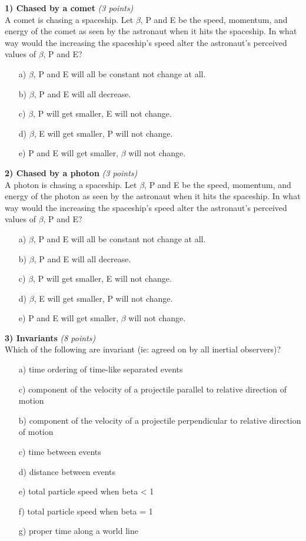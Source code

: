 {\large


\textbf{1) Chased by a comet }\hfill \textit{(3 points)}\\
A comet is chasing a spaceship.
Let $\beta$, P and E be the speed, momentum, and energy of the comet as seen by the astronaut when it hits the spaceship. 
In what way would the increasing the spaceship's speed alter the astronaut's perceived values of $\beta$, P and E?
\begin{itemize}
\item[a)] $\beta$, P and E will all be constant not change at all.
\item[b)] $\beta$, P and E will all decrease.
\item[c)] $\beta$, P will get smaller, E will not change.
\item[d)] $\beta$, E will get smaller, P will not change.
\item[e)] P and E will get smaller, $\beta$ will not change.
\end{itemize}

\vfill

\textbf{2) Chased by a photon }\hfill \textit{(3 points)}\\
A photon is chasing a spaceship.
Let $\beta$, P and E be the speed, momentum, and energy of the photon as seen by the astronaut when it hits the spaceship. 
In what way would the increasing the spaceship's speed alter the astronaut's perceived values of $\beta$, P and E?
\begin{itemize}
\item[a)] $\beta$, P and E will all be constant not change at all.
\item[b)] $\beta$, P and E will all decrease.
\item[c)] $\beta$, P will get smaller, E will not change.
\item[d)] $\beta$, E will get smaller, P will not change.
\item[e)] P and E will get smaller, $\beta$ will not change.
\end{itemize}

\vfill

\textbf{3) Invariants }\hfill \textit{(8 points)}\\
Which of the following are invariant (ie: agreed on by all inertial observers)?
\begin{itemize}
\item[a)] time ordering of time-like separated events
\item[c)] component of the velocity of a projectile parallel to relative direction of motion
\item[b)] component of the velocity of a projectile perpendicular to relative direction of motion
\item[c)] time between events
\item[d)] distance between events
\item[e)] total particle speed when beta < 1
\item[f)] total particle speed when beta = 1
\item[g)] proper time along a world line
\end{itemize}

}
